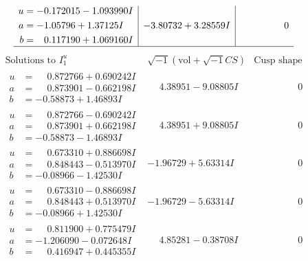\documentclass[1p]{elsarticle_modified}
\theoremstyle{definition}
\newcommand{\I}{\sqrt{-1}}
\begin{document}
$$\begin{array}{c|c|c}
\begin{aligned}
u &= -0.172015 - 1.093990 I \\
a &= -1.05796 + 1.37125 I \\
b &= \phantom{-}0.117190 + 1.069160 I\end{aligned}
 & -3.80732 + 3.28559 I & \phantom{-0.000000 } 0\\
 \hline 
 \end{array}$$\newpage$$\begin{array}{c|c|c}  
\text{Solutions to }I^u_{1}& \I (\text{vol} + \sqrt{-1}CS) & \text{Cusp shape}\\
 \hline 
\begin{aligned}
u &= \phantom{-}0.872766 + 0.690242 I \\
a &= \phantom{-}0.873901 - 0.662198 I \\
b &= -0.58873 + 1.46893 I\end{aligned}
 & \phantom{-}4.38951 - 9.08805 I & \phantom{-0.000000 } 0 \\ \hline\begin{aligned}
u &= \phantom{-}0.872766 - 0.690242 I \\
a &= \phantom{-}0.873901 + 0.662198 I \\
b &= -0.58873 - 1.46893 I\end{aligned}
 & \phantom{-}4.38951 + 9.08805 I & \phantom{-0.000000 } 0 \\ \hline\begin{aligned}
u &= \phantom{-}0.673310 + 0.886698 I \\
a &= \phantom{-}0.848443 - 0.513970 I \\
b &= -0.08966 - 1.42530 I\end{aligned}
 & -1.96729 + 5.63314 I & \phantom{-0.000000 } 0 \\ \hline\begin{aligned}
u &= \phantom{-}0.673310 - 0.886698 I \\
a &= \phantom{-}0.848443 + 0.513970 I \\
b &= -0.08966 + 1.42530 I\end{aligned}
 & -1.96729 - 5.63314 I & \phantom{-0.000000 } 0 \\ \hline\begin{aligned}
u &= \phantom{-}0.811900 + 0.775479 I \\
a &= -1.206090 - 0.072648 I \\
b &= \phantom{-}0.416947 + 0.445355 I\end{aligned}
 & \phantom{-}4.85281 - 0.38708 I & \phantom{-0.000000 } 0 \\ \hline\begin{aligned}

\end{aligned}
\end{array}$$
\end{document}
